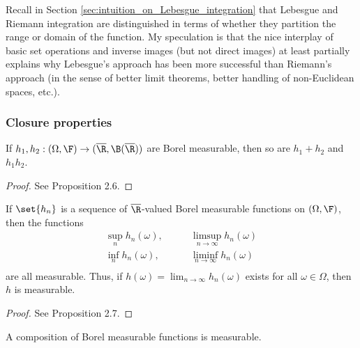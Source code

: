 \documentclass{article} %
\begin{document}
Recall in Section \ref{sec:intuition_on_Lebesgue_integration} that Lebesgue and Riemann integration are distinguished in terms of whether they partition the range or domain of the function.  My speculation is that the nice interplay of basic set operations and inverse images (but not direct images) at least partially explains why Lebesgue's approach has been more successful than Riemann's approach (in the sense of better limit theorems, better handling of non-Euclidean spaces, etc.).

\subsubsection{Closure properties} \label{sec:closure_properties_of_measurable_functions}

\begin{proposition}
If $h_1, h_2 : (\Omega, \F) \to (\overline{\R}, \B(\overline{\R}))$ are Borel measurable, then so are $h_1 + h_2$ and $h_1 h_2$.  
\label{prop:borel_measurability_closed_under_multiplication_and_addition}
\end{proposition}

\begin{proof}
See \cite{folland1999real} Proposition 2.6.
\end{proof}

\begin{proposition}
If $\set{h_n}$ is a sequence of $\overline{\R}$-valued Borel measurable functions on $(\Omega, \F)$, then the functions
\begin{align*}
\sup_n h_n(\omega), & \quad \quad \limsup_{n \to \infty} h_n(\omega) \\
\inf_n h_n(\omega), & \quad \quad  \liminf_{n \to \infty} h_n(\omega) \\	
\end{align*}
are all measurable. Thus, if $h(\omega) = \lim_{n \to \infty} h_n(\omega)$ exists for all $\omega \in \Omega$, then $h$ is measurable.
\label{prop:borel_measurability_closed_under_inf_sup_liminf_limsup}
\end{proposition}

\begin{proof}
See \cite{folland1999real} Proposition 2.7.
\end{proof}

\begin{proposition} 
A composition of Borel measurable functions is measurable.
\label{prop:a_composition_of_Borel_measurable_functions_is_measurable}
\end{proposition}
\end{document}
